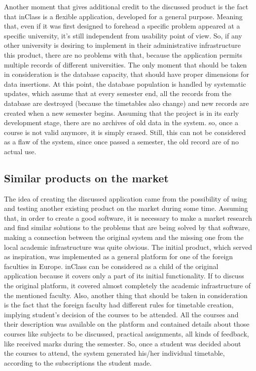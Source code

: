 Another moment that gives additional credit to the discussed product is the fact that inClass is a flexible application, developed for a general purpose. Meaning that, even if it was first designed to forehead a specific problem appeared at a specific university, it's still independent from usability point of view. So, if any other university is desiring to implement in their administrative infrastructure this product, there are no problems with that, because the application permits multiple records of different universities. The only moment that should be taken in consideration is the database capacity, that should have proper dimensions for data insertions. At this point, the database population is handled by systematic updates, which assume that at every semester end, all the records from the database are destroyed (because the timetables also change) and new records are created when a new semester begins. Assuming that the project is in its early development stage, there are no archives of old data in the system. so, once a course is not valid anymore, it is simply erased. Still, this can not be considered as a flaw of the system, since once passed a semester, the old record are of no actual use.

\subsection{Similar products on the market}
The idea of creating the discussed application came from the possibility of using and testing another existing product on the market during some time. Assuming that, in order to create a good software, it is necessary to make a market research and find similar solutions to the problems that are being solved by that software, making a connection between the original system and the missing one from the local academic infrastructure was quite obvious. The initial product, which served as inspiration, was implemented as a general platform for one of the foreign faculties in Europe. inClass can be considered as a child of the original application because it covers only a part of its initial functionality. If to discuss the original platform, it covered almost completely the academic infrastructure of the mentioned faculty. Also, another thing that should be taken in consideration is the fact that the foreign faculty had different rules for timetable creation, implying student's decision of the courses to be attended. All the courses and their description was available on the platform and contained details about those courses like subjects to be discussed, practical assignments, all kinds of feedback, like received marks during the semester. So, once a student was decided about the courses to attend, the system generated his/her individual timetable, according to the subscriptions the student made. 

